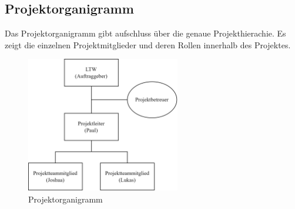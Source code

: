\subsection{Projektorganigramm}

Das Projektorganigramm gibt aufschluss über die genaue Projekthierachie. Es zeigt die einzelnen Projektmitglieder und deren Rollen innerhalb des Projektes\cite{projektorganigramm}.

\begin{figure}[H]
  \centering
  \includegraphics[width=0.6\textwidth]{images/projektorganigramm.png}
  \caption{Projektorganigramm}
  \label{fig:projektorganigramm}
\end{figure}